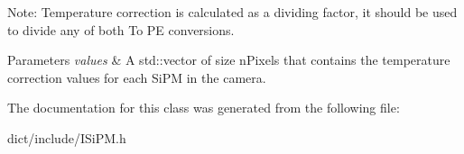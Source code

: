 Note\+: Temperature correction is calculated as a dividing factor, it should be used to divide any of both To PE conversions.


\begin{DoxyParams}{Parameters}
{\em values} & A std\+::vector of size n\+Pixels that contains the temperature correction values for each Si\+PM in the camera. \\
\hline
\end{DoxyParams}


The documentation for this class was generated from the following file\+:\begin{DoxyCompactItemize}
\item 
dict/include/I\+Si\+P\+M.\+h\end{DoxyCompactItemize}
